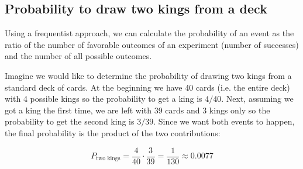 \subsection{Probability to draw two kings from a deck}
Using a frequentist approach, we can calculate the
probability of an event as the ratio of the number of favorable outcomes
of an experiment (number of successes) and the number of all possible
outcomes. 

Imagine we would like to determine the probability of drawing two kings from a standard deck of cards.
At the beginning we have 40 cards (i.e. the entire deck) with 4 possible kings so the probability to get a king is $4/40$. Next, assuming we got a king the first time, we are left with 39 cards and 3 kings only so the probability to get the second king is $3/39$. Since we want both events to happen, the final probability is the product of the two contributions:

\[P_\textrm{two kings} = \frac{4}{40} \cdot \frac{3}{39} = \frac{1}{130} \approx 0.0077\]

